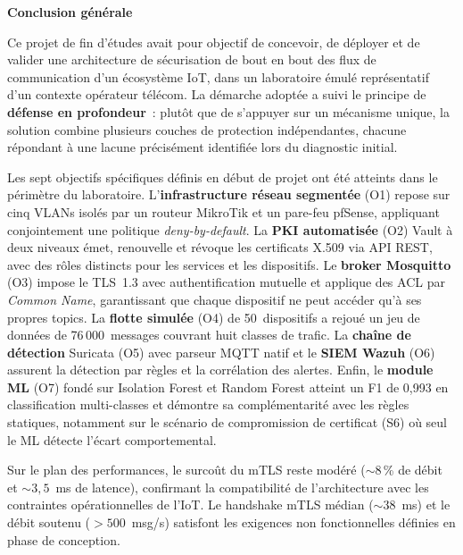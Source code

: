 \clearpage
{}
{}
\begin{center}
{\Large\bfseries Conclusion générale}
\end{center}
\vspace{0.4cm}

Ce projet de fin d'études avait pour objectif de concevoir, de déployer et de valider une architecture de sécurisation de bout en bout des flux de communication d'un écosystème IoT, dans un laboratoire émulé représentatif d'un contexte opérateur télécom. La démarche adoptée a suivi le principe de \textbf{défense en profondeur}~: plutôt que de s'appuyer sur un mécanisme unique, la solution combine plusieurs couches de protection indépendantes, chacune répondant à une lacune précisément identifiée lors du diagnostic initial.

Les sept objectifs spécifiques définis en début de projet ont été atteints dans le périmètre du laboratoire. L'\textbf{infrastructure réseau segmentée} (O1) repose sur cinq VLANs isolés par un routeur MikroTik et un pare-feu pfSense, appliquant conjointement une politique \emph{deny-by-default}. La \textbf{PKI automatisée} (O2) Vault à deux niveaux émet, renouvelle et révoque les certificats X.509 via API REST, avec des rôles distincts pour les services et les dispositifs. Le \textbf{broker Mosquitto} (O3) impose le TLS~1.3 avec authentification mutuelle et applique des ACL par \emph{Common Name}, garantissant que chaque dispositif ne peut accéder qu'à ses propres topics. La \textbf{flotte simulée} (O4) de 50~dispositifs a rejoué un jeu de données de 76\,000~messages couvrant huit classes de trafic. La \textbf{chaîne de détection} Suricata (O5) avec parseur MQTT natif et le \textbf{SIEM Wazuh} (O6) assurent la détection par règles et la corrélation des alertes. Enfin, le \textbf{module ML} (O7) fondé sur Isolation Forest et Random Forest atteint un F1 de 0,993 en classification multi-classes et démontre sa complémentarité avec les règles statiques, notamment sur le scénario de compromission de certificat (S6) où seul le ML détecte l'écart comportemental.

Sur le plan des performances, le surcoût du mTLS reste modéré ($\sim 8$\,\% de débit et $\sim 3{,}5$~ms de latence), confirmant la compatibilité de l'architecture avec les contraintes opérationnelles de l'IoT. Le handshake mTLS médian ($\sim 38$~ms) et le débit soutenu ($>500$~msg/s) satisfont les exigences non fonctionnelles définies en phase de conception.

